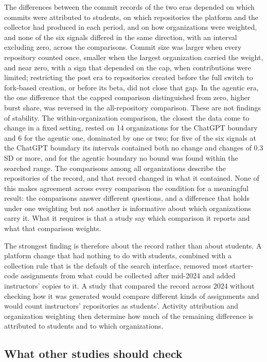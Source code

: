 \documentclass[acmsmall,screen,review,anonymous]{acmart}
\begin{document}
The differences between the commit records of the two eras depended on which commits were attributed to students, on which repositories the platform and the collector had produced in each period, and on how organizations were weighted, and none of the six signals differed in the same direction, with an interval excluding zero, across the comparisons. Commit size was larger when every repository counted once, smaller when the largest organization carried the weight, and near zero, with a sign that depended on the cap, when contributions were limited; restricting the post era to repositories created before the full switch to fork-based creation, or before its beta, did not close that gap. In the agentic era, the one difference that the capped comparison distinguished from zero, higher burst share, was reversed in the all-repository comparison. These are not findings of stability. The within-organization comparison, the closest the data come to change in a fixed setting, rested on 14 organizations for the ChatGPT boundary and 6 for the agentic one, dominated by one or two; for five of the six signals at the ChatGPT boundary its intervals contained both no change and changes of 0.3 SD or more, and for the agentic boundary no bound was found within the searched range. The comparisons among all organizations describe the repositories of the record, and that record changed in what it contained. None of this makes agreement across every comparison the condition for a meaningful result: the comparisons answer different questions, and a difference that holds under one weighting but not another is informative about which organizations carry it. What it requires is that a study say which comparison it reports and what that comparison weights.

The strongest finding is therefore about the record rather than about students. A platform change that had nothing to do with students, combined with a collection rule that is the default of the search interface, removed most starter-code assignments from what could be collected after mid-2024 and added instructors' copies to it. A study that compared the record across 2024 without checking how it was generated would compare different kinds of assignments and would count instructors' repositories as students'. Activity attribution and organization weighting then determine how much of the remaining difference is attributed to students and to which organizations.

\subsection{What other studies should check}
\end{document}
